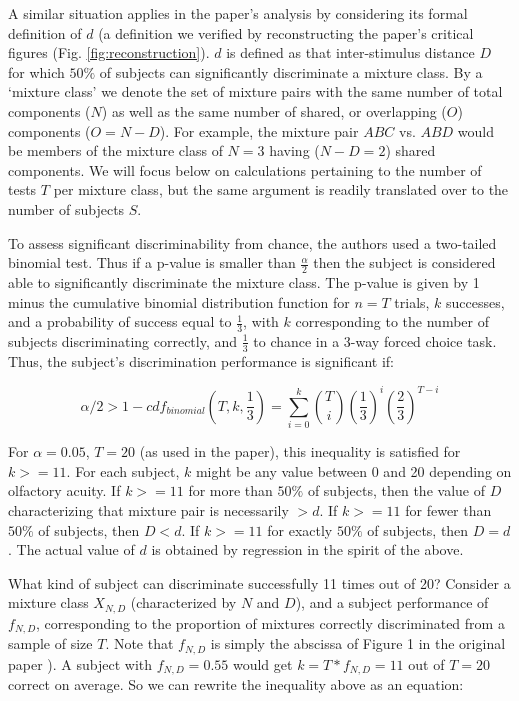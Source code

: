 \documentclass[letterpaper,twocolumn,10pt]{article}
\begin{document}
A similar situation applies in the paper's analysis by considering its formal definition of $d$ 
(a definition we verified by reconstructing the paper's critical figures (Fig. \ref{fig:reconstruction}). 
$d$ is defined as that inter-stimulus distance $D$ for which $50\%$ of subjects can significantly discriminate a mixture class. 
By a `mixture class' we denote the set of mixture pairs with the same number of total components ($N$) 
as well as the same number of shared, or overlapping ($O$) components ($O=N-D$). 
For example, the mixture pair $ABC$ vs. $ABD$ would be members of the mixture class of $N=3$ having ($N-D=2$) shared components. 
We will focus below on calculations pertaining to the number of tests $T$ per mixture class, 
but the same argument is readily translated over to the number of subjects $S$.

To assess significant discriminability from chance, 
the authors used a two-tailed binomial test. 
Thus if a p-value is smaller than $\frac{\alpha}{2}$ then the subject is considered able to significantly discriminate the mixture class.  
The p-value is given by 1 minus the cumulative binomial distribution function for $n=T$ trials, $k$ successes, 
and a probability of success equal to $\frac{1}{3}$, 
with $k$ corresponding to the number of subjects discriminating correctly, and $\frac{1}{3}$ to chance in a 3-way forced choice task.  
Thus, the subject's discrimination performance is significant if: 

\begin{equation}
\label{eq:analytical1}
\alpha/2 > 1 - cdf_{binomial}(T,k,\frac{1}{3}) = \sum_{i=0}^{k} \binom{T}{i}(\frac{1}{3})^{i}(\frac{2}{3})^{T-i}
\end{equation}

For $\alpha=0.05$, $T=20$ (as used in the paper), this inequality is satisfied for $k>=11$.  
For each subject, $k$ might be any value between 0 and 20 depending on olfactory acuity.  
If $k>=11$ for more than $50\%$ of subjects, 
then the value of $D$ characterizing that mixture pair is necessarily $>d$.  
If $k>=11$ for fewer than $50\%$ of subjects, then $D<d$.  
If $k>=11$ for exactly $50\%$ of subjects, then $D=d$.  
The actual value of $d$ is obtained by regression in the spirit of the above.  

What kind of subject can discriminate successfully 11 times out of 20?  
Consider a mixture class $X_{N,D}$ (characterized by $N$ and $D$), 
and a subject performance of $f_{N,D}$, 
corresponding to the proportion of mixtures correctly discriminated from a sample of size $T$.  
Note that $f_{N,D}$ is simply the abscissa of Figure 1 in the original paper \cite{bushdid_humans_2014}).   
A subject with $f_{N,D}=0.55$ would get $k=T*f_{N,D}=11$ out of $T=20$ correct on average.  
So we can rewrite the inequality above as an equation:  
\end{document}
